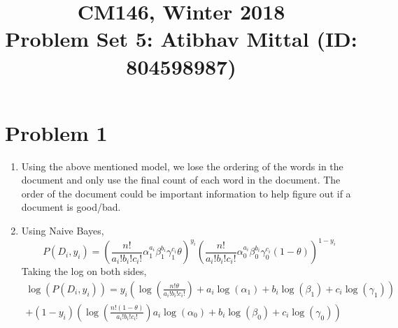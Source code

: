\documentclass[11pt]{article}
\newcommand{\cnum}{CM146}
\newcommand{\ced}{Winter 2018}
\newcommand{\ctitle}[3]{\title{\vspace{-0.5in}\cnum, \ced\\Problem Set #1: #2}}
\newcommand{\solution}[1]{{{\color{blue}{\bf Solution:} {#1}}}}
\begin{document}
\ctitle{5}{Atibhav Mittal (ID: 804598987)}
\author{}
\date{}
\maketitle
\vspace{-0.75in}

\section{Problem 1}
\begin{enumerate}
\item \solution{} \newline
Using the above mentioned model, we lose the ordering of the words in the document
and only use the final count of each word in the document. The order of the document
could be important information to help figure out if a document is good/bad.

\item \solution{} \newline
Using Naive Bayes,
$$
P(D_i, y_i) = \left( \frac{n!}{a_i ! b_i ! c_ i !} \alpha_1^{a_i} \beta_1^{b_i} \gamma_1 ^ {c_i} \theta  \right) ^ {y_i}
			\left( \frac{n!}{a_i ! b_i ! c_ i !} \alpha_0^{a_i} \beta_0^{b_i} \gamma_0 ^ {c_i} (1 - \theta)  \right) ^ {1 - y_i}
$$
Taking the log on both sides,
\begin{align*} \label{eq:pareto mle2}
\log (P(D_i, y_i)) = y_i \left( \log \left(  \frac{n! \theta}{a_i ! b_i ! c_ i !} \right) + a_i \log(\alpha_1) + b_i \log(\beta_1) + c_i \log(\gamma_1) \right) \\
	+ (1 - y_i) \left( \log \left(  \frac{n! (1 - \theta)}{a_i ! b_i ! c_ i !} \right)  a_i \log(\alpha_0) + b_i \log(\beta_0) + c_i \log(\gamma_0) \right)
\end{align*}


\end{enumerate}
\end{document}

